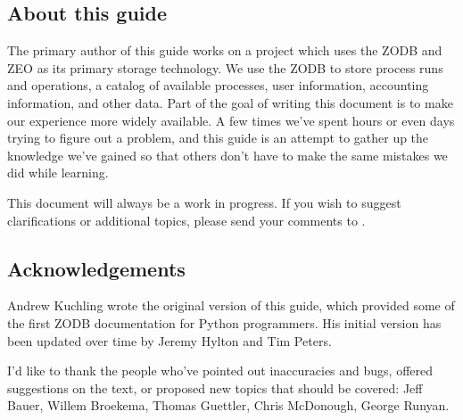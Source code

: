 \subsection{About this guide}

The primary author of this guide works on a project which uses the
ZODB and ZEO as its primary storage technology.  We use the ZODB to
store process runs and operations, a catalog of available processes,
user information, accounting information, and other data.  Part of the
goal of writing this document is to make our experience more widely
available.  A few times we've spent hours or even days trying to
figure out a problem, and this guide is an attempt to gather up the
knowledge we've gained so that others don't have to make the same
mistakes we did while learning.

This document will always be a work in progress.  If you wish to
suggest clarifications or additional topics, please send your comments to
.  

\subsection{Acknowledgements}

Andrew Kuchling wrote the original version of this guide, which
provided some of the first ZODB documentation for Python programmers.
His initial version has been updated over time by Jeremy Hylton and
Tim Peters.

I'd like to thank the people who've pointed out inaccuracies and bugs,
offered suggestions on the text, or proposed new topics that should be
covered: Jeff Bauer, Willem Broekema, Thomas Guettler,
Chris McDonough, George Runyan.
